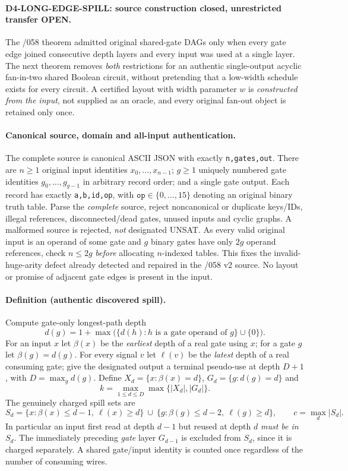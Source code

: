 \documentclass[11pt]{article}
\begin{document}
\paragraph{D4-LONG-EDGE-SPILL: source construction closed, unrestricted transfer OPEN.}
The /058 theorem admitted original shared-gate DAGs only when every gate edge
joined consecutive depth layers and every input was used at a single layer.
The next theorem removes \emph{both} restrictions for an authentic
single-output acyclic fan-in-two shared Boolean circuit, without pretending
that a low-width schedule exists for every circuit. A certified layout with
width parameter $w$ is \emph{constructed from the input}, not supplied as
an oracle, and every original fan-out object is retained only once.

\paragraph{Canonical source, domain and all-input authentication.}
The complete source is canonical ASCII JSON with exactly
\texttt{n,gates,out}. There are $n\ge1$ original input identities
$x_0,\ldots,x_{n-1}$; $g\ge1$ uniquely numbered gate identities
$g_0,\ldots,g_{g-1}$ in arbitrary record order; and a single gate output.
Each record has exactly \texttt{a,b,id,op}, with $\texttt{op}\in
\{0,\ldots,15\}$ denoting an original binary truth table. Parse the
\emph{complete} source, reject noncanonical or duplicate keys/IDs, illegal
references, disconnected/dead gates, unused inputs and cyclic graphs.
A malformed source is rejected, \emph{not} designated UNSAT. As every
valid original input is an operand of some gate and $g$ binary gates have
only $2g$ operand references, check $n\le2g$ \emph{before} allocating
$n$-indexed tables. This fixes the invalid-huge-arity defect already
detected and repaired in the /058 v2 source. No layout or promise of
adjacent gate edges is present in the input.

\paragraph{Definition (authentic discovered spill).}
Compute gate-only longest-path depth
\[
d(g)=1+\max\bigl(\{d(h):h\text{ is a gate operand of }g\}
\cup\{0\}\bigr).
\]
For an input $x$ let $\beta(x)$ be the \emph{earliest} depth of a real
gate using $x$; for a gate $g$ let $\beta(g)=d(g)$.
For every signal $v$ let $\ell(v)$ be the \emph{latest}
depth of a real consuming gate; give the designated output a terminal
pseudo-use at depth $D+1$, with $D=\max_g d(g)$.
Define $X_d=\{x:\beta(x)=d\}$,
$G_d=\{g:d(g)=d\}$ and
\[
k=\max_{1\le d\le D}\max\{|X_d|,|G_d|\}.
\]
The genuinely charged spill sets are
\[
S_d=
\{x:\beta(x)\le d-1,\ \ell(x)\ge d\}
\ \cup\
\{g:\beta(g)\le d-2,\ \ell(g)\ge d\},
\qquad c=\max_d |S_d|.
\]
In particular an input first read at depth $d-1$ but reused at depth
$d$ \emph{must be in $S_d$}. The immediately preceding
\emph{gate} layer $G_{d-1}$ is excluded from $S_d$, since it is charged
separately. A shared gate/input identity is counted once regardless
of the number of consuming wires.
\end{document}
